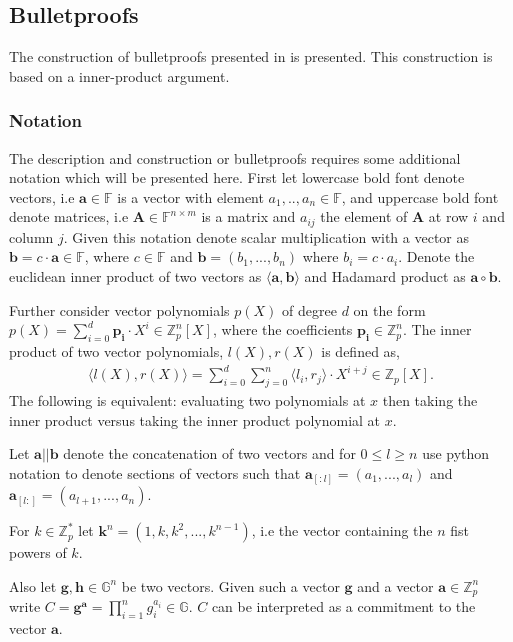 \subsection{Bulletproofs}
The construction of bulletproofs presented in \cite{bulletProofs_theory} is presented. This construction is based on a inner-product argument. 
\subsubsection*{Notation}
The description and construction or bulletproofs requires some additional notation which will be presented here. First let lowercase bold font denote vectors, i.e $\mathbf{a}\in\mathds{F}$ is a vector with element $a_1,..,a_n \in \mathds{F}$, and uppercase bold font denote matrices, i.e $\mathbf{A}\in\mathds{F}^{n\times m}$ is a matrix and $a_{ij}$ the element of $\mathbf{A}$ at row $i$ and column $j$. Given this notation denote scalar multiplication with a vector as $\mathbf{b}=c\cdot \mathbf{a}\in\mathds{F}$, where $c\in\mathds{F}$ and $\mathbf{b}=(b_1,...,b_n)$ where $b_i=c\cdot a_i$. Denote the euclidean inner product of two vectors as $\langle \mathbf{a},\mathbf{b}\rangle$ and Hadamard product as $\mathbf{a}\circ \mathbf{b}$.

Further consider vector polynomials $p(X)$ of degree $d$ on the form $p(X)=\sum_{i=0}^d \mathbf{p_i}\cdot X^i\in\mathds{Z}_p^n[X]$, where the coefficients $\mathbf{p_i}\in\mathds{Z}_p^n$. The inner product of two vector polynomials, $l(X),r(X)$ is defined as, 
\begin{align*}
    \langle l(X),r(X)\rangle = \sum_{i=0}^d\sum_{j=0}^n \langle l_i,r_j\rangle \cdot X^{i+j}\in\mathds{Z}_p[X].
\end{align*}
The following is equivalent: evaluating two polynomials at $x$ then taking the inner product versus taking the inner product polynomial at $x$.

Let $\mathbf{a}||\mathbf{b}$ denote the concatenation of two vectors and for $0\leq l\geq n$ use python notation to denote sections of vectors such that $\mathbf{a}_{[:l]} = (a_1,...,a_l)$ and $\mathbf{a}_{[l:]} = (a_{l+1},...,a_n)$. 

For $k\in\mathds{Z}_p^*$ let $\mathbf{k}^n=(1,k,k^2,...,k^{n-1})$, i.e the vector containing the $n$ fist powers of $k$. 

Also let $\mathbf{g},\mathbf{h}\in\mathds{G}^n$ be two vectors. Given such a vector $\mathbf{g}$ and a vector $\mathbf{a}\in\mathds{Z}_p^n$ write $C= \mathbf{g}^\mathbf{a} = \prod_{i=1}^ng_i^{a_i}\in\mathds{G}$. $C$ can be interpreted as a commitment to the vector $\mathbf{a}$.

